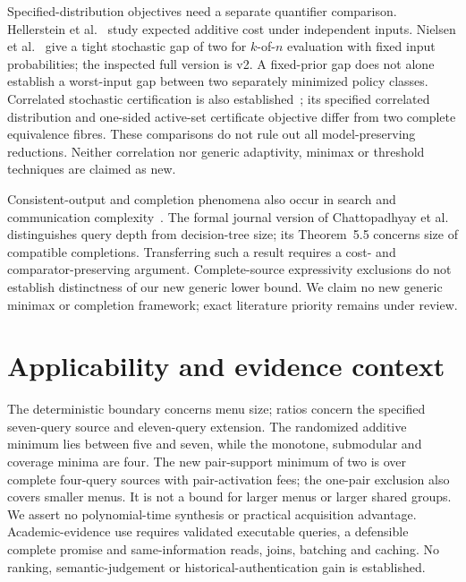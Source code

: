 \documentclass[pdflatex,sn-mathphys-num]{sn-jnl}
\theoremstyle{thmstyleone}
\theoremstyle{thmstylethree}
\theoremstyle{thmstyletwo}
\begin{document}
Specified-distribution objectives need a separate quantifier comparison.
Hellerstein et al.~\cite{hellerstein2022adaptivity} study expected additive
cost under independent inputs. Nielsen et al.~\cite{nielsen2025kofn}
give a tight stochastic gap of two for $k$-of-$n$ evaluation with fixed
input probabilities; the inspected full version is v2. A fixed-prior
gap does not alone establish a worst-input gap between two separately
minimized policy classes. Correlated stochastic certification is also
established~\cite{ghuge2026correlations}; its specified correlated
distribution and one-sided active-set certificate objective differ from
two complete equivalence fibres. These comparisons do not rule out all
model-preserving reductions. Neither correlation nor generic adaptivity,
minimax or threshold techniques are claimed as new.

Consistent-output and completion phenomena also occur in search and communication complexity~\cite{chattopadhyay2025pseudo,goos2026pseudo,watson2026pseudo}. The formal journal version of Chattopadhyay et al. distinguishes query depth from decision-tree size; its Theorem~5.5 concerns size of compatible completions. Transferring such a result requires a cost- and comparator-preserving argument. Complete-source expressivity exclusions do not establish distinctness of our new generic lower bound. We claim no new generic minimax or completion framework; exact literature priority remains under review.

\section{Applicability and evidence context}\label{app:scope-context}
The deterministic boundary concerns menu size; ratios concern the
specified seven-query source and eleven-query extension. The randomized
additive minimum lies between five and seven, while the monotone,
submodular and coverage minima are four. The new pair-support minimum
of two is over complete four-query sources with pair-activation fees;
the one-pair exclusion also covers smaller menus. It is not a bound
for larger menus or larger shared groups. We assert no polynomial-time
synthesis or practical acquisition advantage. Academic-evidence use
requires validated executable queries, a defensible complete promise
and same-information reads, joins, batching and caching. No ranking,
semantic-judgement or historical-authentication gain is established.
\end{document}
